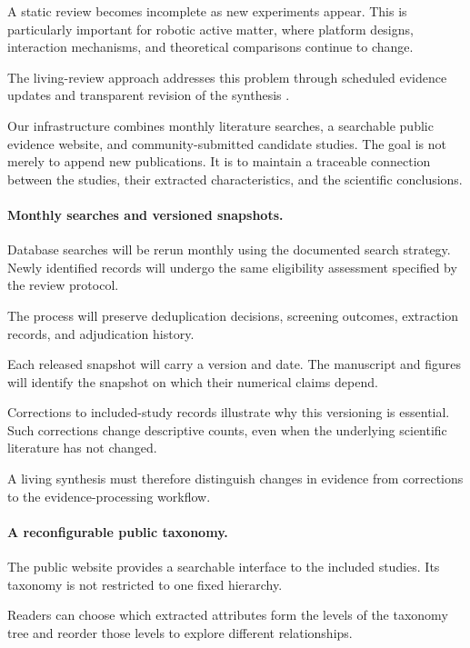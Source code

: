 A static review becomes incomplete as new
experiments appear. This is particularly
important for robotic active matter,
where platform designs, interaction
mechanisms, and theoretical comparisons
continue to change.

The living-review approach addresses
this problem through scheduled evidence
updates and transparent revision
of the synthesis
\cite{Elliott2014living,Elliott2017living}.

Our infrastructure combines monthly
literature searches, a searchable
public evidence website,
and community-submitted candidate
studies. The goal is not merely
to append new publications.
It is to maintain a traceable
connection between the studies,
their extracted characteristics,
and the scientific conclusions.

\paragraph*{Monthly searches and versioned snapshots.}

Database searches will be rerun monthly
using the documented search strategy.
Newly identified records will undergo
the same eligibility assessment
specified by the review protocol.

The process will preserve
deduplication decisions,
screening outcomes,
extraction records,
and adjudication history.

Each released snapshot will
carry a version and date.
The manuscript and figures
will identify the snapshot
on which their numerical
claims depend.

Corrections to included-study
records illustrate why this
versioning is essential.
Such corrections change
descriptive counts, even when
the underlying scientific
literature has not changed.

A living synthesis must
therefore distinguish
changes in evidence
from corrections to
the evidence-processing
workflow.

\paragraph*{A reconfigurable public taxonomy.}

The public website provides a searchable
interface to the included studies.
Its taxonomy is not restricted
to one fixed hierarchy.

Readers can choose which extracted
attributes form the levels of
the taxonomy tree and reorder
those levels to explore
different relationships.

